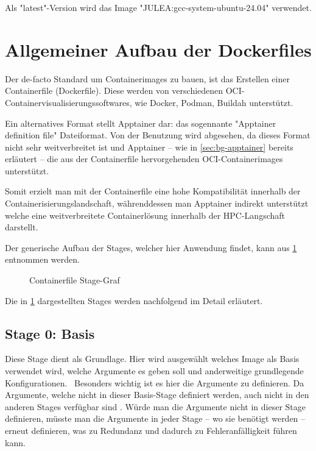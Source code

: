 Als "latest"-Version wird das Image "JULEA:gcc-system-ubuntu-24.04" verwendet. 

\section{Allgemeiner Aufbau der Dockerfiles} \label{sec:allgemeiner-aufbau-der-dockerfiles}

Der de-facto Standard um Containerimages zu bauen, ist das Erstellen einer Containerfile (Dockerfile). Diese werden von verschiedenen OCI-Containervisualisierungssoftwares, wie Docker, Podman, Buildah unterstützt. 

Ein alternatives Format stellt Apptainer dar: das sogennante "Apptainer definition file" Dateiformat. Von der Benutzung wird abgesehen, da dieses Format nicht sehr weitverbreitet ist und Apptainer – wie in \cref{sec:bg-apptainer} bereits erläutert – die aus der Containerfile hervorgehenden OCI-Containerimages unterstützt. 

Somit erzielt man mit der Containerfile eine hohe Kompatibilität innerhalb der Containerisierungslandschaft, währenddessen man Apptainer indirekt unterstützt welche eine weitverbreitete Containerlösung innerhalb der HPC-Langschaft darstellt.

Der generische Aufbau der Stages, welcher hier Anwendung findet, kann aus \cref{fig:containerfile-stage-graph} entnommen werden.

\begin{figure}[!htbp]
    \centering
    
    \caption{Containerfile Stage-Graf}
    \label{fig:containerfile-stage-graph}
\end{figure}

\FloatBarrier

Die in \cref{fig:containerfile-stage-graph} dargestellten Stages werden nachfolgend im Detail erläutert.

\subsection{Stage 0: Basis} \label{sec:generic-stage-0}

Diese Stage dient als Grundlage. Hier wird ausgewählt welches Image als Basis verwendet wird, welche Argumente es geben soll und anderweitige grundlegende Konfigurationen. \
Besonders wichtig ist es hier die Argumente zu definieren. Da Argumente, welche nicht in dieser Basis-Stage definiert werden, auch nicht in den anderen Stages verfügbar sind \cite[Vgl. "Understand how ARG and FROM interact"]{DockerfileReference0100}. Würde man die Argumente nicht in dieser Stage definieren, müsste man die Argumente in jeder Stage – wo sie benötigt werden – erneut definieren, was zu Redundanz und dadurch zu Fehleranfälligkeit führen kann.


